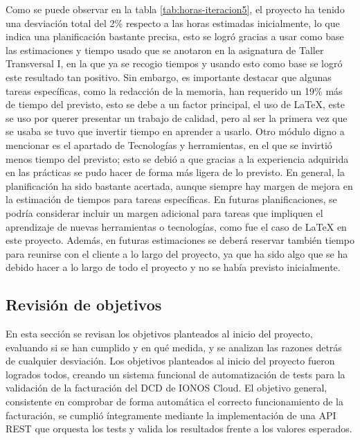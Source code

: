 Como se puede observar en la tabla \ref{tab:horas-iteracion5}, el proyecto ha tenido una desviación total del 2\% respecto a
 las horas estimadas inicialmente, lo que indica una planificación bastante precisa, esto se logró gracias a usar como base
 las estimaciones y tiempo usado que se anotaron en la asignatura de Taller Transversal I,
  en la que ya se recogio tiempos y usando esto como base se logró este resultado tan positivo. 
  Sin embargo, es importante destacar que algunas tareas específicas, como la redacción de la memoria,
   han requerido un 19\% más de tiempo del previsto, esto se debe a un factor principal,
    el uso de LaTeX, este se uso por querer presentar un trabajo de calidad, pero al ser
     la primera vez que se usaba se tuvo que invertir tiempo en aprender a usarlo. Otro módulo digno 
     a mencionar es el apartado de Tecnologías y herramientas, en el que se invirtió menos tiempo del
      previsto; esto se debió a que gracias a la experiencia adquirida en las prácticas se pudo
      hacer de forma más ligera de lo previsto. En general, la planificación ha sido bastante acertada,
       aunque siempre hay margen de mejora en la estimación de tiempos para tareas específicas. 
       En futuras planificaciones, se podría considerar incluir un margen adicional para tareas 
       que impliquen el aprendizaje de nuevas herramientas o tecnologías, como fue el caso de LaTeX
        en este proyecto. Además, en futuras estimaciones se deberá reservar también tiempo para reunirse con 
        el cliente a lo largo del proyecto, ya que ha sido algo que se ha debido hacer a lo largo de todo el 
        proyecto y no se había previsto inicialmente.

        \subsection{Revisión de objetivos}
        En esta sección se revisan los objetivos planteados al inicio del proyecto, evaluando si se han cumplido y en qué medida, y se analizan las razones detrás de cualquier desviación. Los objetivos planteados al inicio del proyecto fueron logrados todos, creando un sistema funcional de automatización de tests para la validación de la facturación del DCD de IONOS Cloud. El objetivo general, consistente en comprobar de forma automática el correcto funcionamiento de la facturación, se cumplió íntegramente mediante la implementación de una API REST que orquesta los tests y valida los resultados frente a los valores esperados.

